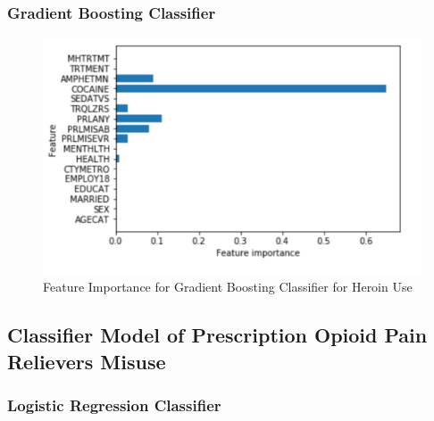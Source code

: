 \documentclass[sigconf]{acmart}
\begin{document}
\subsubsection{Gradient Boosting Classifier}


\begin{figure}[!ht]
  \centering\includegraphics[width=\columnwidth]{images/Figure8.pdf}
  \caption{Feature Importance for Gradient Boosting Classifier for Heroin Use}
  \label{f:Figure8}
\end{figure}



\subsection{Classifier Model of Prescription Opioid Pain Relievers Misuse}

\subsubsection{Logistic Regression Classifier}
\end{document}
